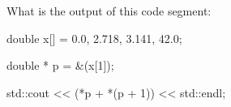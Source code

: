 What is the output of this code segment:



\begin{consolethree}[escapeinside=||]

double x[] = {0.0, 2.718, 3.141, 42.0};

double * p = &(x[1]);

std::cout << (*p + *(p + 1)) << std::endl;

\end{consolethree}

